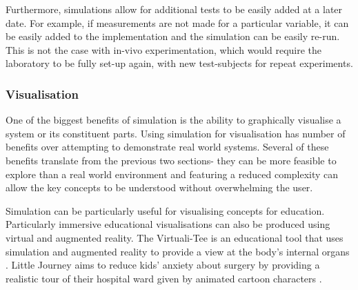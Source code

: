 \documentclass{UoYCSproject}
\begin{document}

Furthermore, simulations allow for additional tests to be easily added at a later date.
For example, if measurements are not made for a particular variable, it can be easily added to the implementation and the simulation can be easily re-run.
This is not the case with in-vivo experimentation, which would require the laboratory to be fully set-up again, with new test-subjects for repeat experiments.


\subsubsection{Visualisation}
\label{visualisation}
One of the biggest benefits of simulation is the ability to graphically visualise a system or its constituent parts.
Using simulation for visualisation has number of benefits over attempting to demonstrate real world systems.
Several of these benefits translate from the previous two sections- they can be more feasible to explore than a real world environment and featuring a reduced complexity can allow the key concepts to be understood without overwhelming the user.

Simulation can be particularly useful for visualising concepts for education. 
Particularly immersive educational visualisations can also be produced using virtual and augmented reality.
The Virtuali-Tee is an educational tool that uses simulation and augmented reality to provide a view at the body's internal organs \cite{curiscope}.
Little Journey aims to reduce kids' anxiety about surgery by providing a realistic tour of their hospital ward given by animated cartoon characters \cite{little_journey}.


\end{document}
